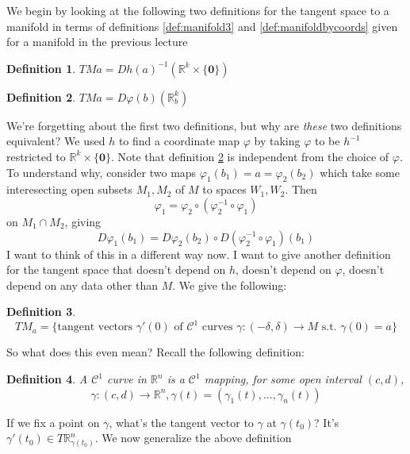 \documentclass{article}
\newtheorem{definition}{Definition}
\newcommand{\reals}[0]{\mathbb{R}}
\newcommand{\mc}[1]{\mathcal{#1}}
\newcommand{\mb}[1]{\mathbf{#1}}
\begin{document}
We begin by looking at the following two definitions for the tangent space to a manifold in terms of definitions \ref{def:manifold3} and \ref{def:manifoldbycoords} given for a manifold in the previous lecture
\begin{definition}
  \(TMa = Dh(a)^{-1}(\reals^k \times \{\mb{0}\})\)
\end{definition}
\begin{definition}
  \label{vfdef} \(TMa = D\varphi(b)(\reals^k_b)\)
\end{definition}
We're forgetting about the first two definitions, but why are \textit{these} two definitions equivalent? We used \(h\) to find a coordinate map \(\varphi\) by taking \(\varphi\) to be \(h^{-1}\) restricted to \(\reals^k \times \{\mb{0}\}\). Note that definition \ref{vfdef} is independent from the choice of \(\varphi\). To understand why, consider two maps \(\varphi_1(b_1) = a = \varphi_2(b_2)\) which take some interesecting open subsets \(M_1, M_2\) of \(M\) to spaces \(W_1, W_2\). Then
\begin{equation}\varphi_1 = \varphi_2 \circ (\varphi_2^{-1} \circ \varphi_1)\end{equation}
on \(M_1 \cap M_2\), giving
\begin{equation}D\varphi_1(b_1) = D\varphi_2(b_2) \circ D(\varphi_2^{-1}\circ\varphi_1)(b_1)\end{equation}
I want to think of this in a different way now. I want to give another definition for the tangent space that doesn't depend on \(h\), doesn't depend on \(\varphi\), doesn't depend on any data other than \(M\). We give the following:
\begin{definition}
  \begin{equation}TM_a = \{\text{tangent vectors } \gamma'(0) \text{ of } \mc{C^1} \text{ curves } \gamma: (-\delta, \delta) \to M \text{ s.t. } \gamma(0) = a\}\end{equation}
\end{definition}
So what does this even mean? Recall the following definition:
\begin{definition}
  A \(\mc{C}^1\) curve in \(\reals^n\) is a \(\mc{C}^1\) mapping, for some open interval \((c, d)\),
  \begin{equation}\gamma: (c, d) \to \reals^n, \gamma(t) = (\gamma_1(t),...,\gamma_n(t))\end{equation}
  \label{newdef}
\end{definition}
If we fix a point on \(\gamma\), what's the tangent vector to \(\gamma\) at \(\gamma(t_0)\)? It's \(\gamma'(t_0) \in T\reals^n_{\gamma(t_0)}\). We now generalize the above definition
\end{document}

